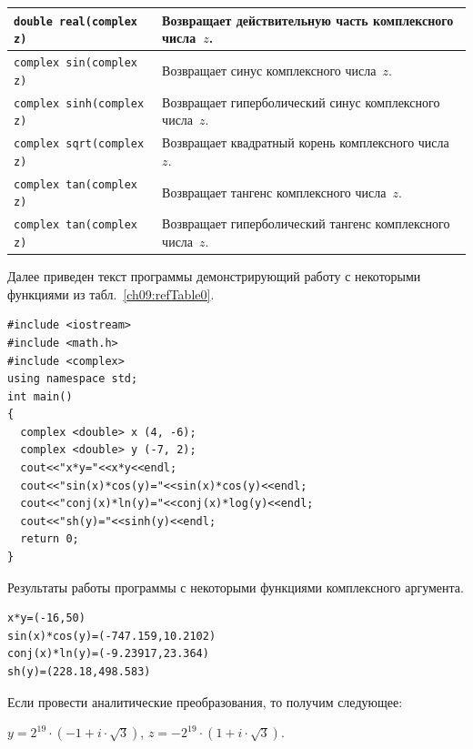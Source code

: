{\begin{longtable}{|p{}|p{}|}
\lstinline!double real(complex z)! &Возвращает действительную часть комплексного числа~$z$.\\\hline
\lstinline!complex sin(complex z)! &Возвращает синус комплексного числа~$z$.\\\hline
\lstinline!complex sinh(complex z)! &Возвращает гиперболический синус комплексного числа~$z$.\\\hline
\lstinline!complex sqrt(complex z)! &Возвращает квадратный корень комплексного числа~$z$.\\\hline
\lstinline!complex tan(complex z)! &Возвращает тангенс  комплексного числа~$z$.\\\hline
\lstinline!complex tan(complex z)! &Возвращает гиперболический тангенс комплексного числа~$z$.\\\hline
\end{longtable}
}

Далее приведен текст программы демонстрирующий работу с некоторыми функциями из табл.~\ref{ch09:refTable0}. 
\begin{lstlisting}
#include <iostream>
#include <math.h>
#include <complex>
using namespace std;
int main()
{
  complex <double> x (4, -6);
  complex <double> y (-7, 2);
  cout<<"x*y="<<x*y<<endl;
  cout<<"sin(x)*cos(y)="<<sin(x)*cos(y)<<endl;
  cout<<"conj(x)*ln(y)="<<conj(x)*log(y)<<endl;
  cout<<"sh(y)="<<sinh(y)<<endl;
  return 0;
}
\end{lstlisting}

Результаты работы программы с некоторыми функциями комплексного аргумента.
\begin{verbatim}
x*y=(-16,50)
sin(x)*cos(y)=(-747.159,10.2102)
conj(x)*ln(y)=(-9.23917,23.364)
sh(y)=(228.18,498.583)
\end{verbatim}


Если провести аналитические преобразования, то получим следующее:

 $y=2^{19}\cdot (-1+i\cdot \sqrt{3})$,  $z=-2^{19}\cdot (1+i\cdot \sqrt{3})$.


